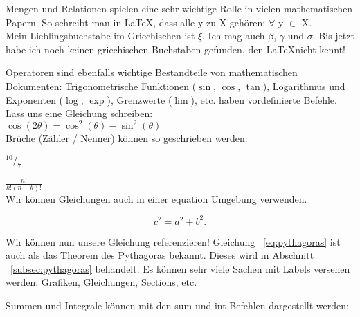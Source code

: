 \documentclass[12pt]{article}
\begin{document}
Mengen und Relationen spielen eine sehr wichtige Rolle in vielen mathematischen
Papern. So schreibt man in \LaTeX, dass alle y zu X gehören: $\forall$ y $\in$ X. \\


Mein Lieblingsbuchstabe im Griechischen ist $\xi$. Ich mag auch $\beta$, $\gamma$ und $\sigma$.
Bis jetzt habe ich noch keinen griechischen Buchstaben gefunden, den \LaTeX nicht kennt!

Operatoren sind ebenfalls wichtige Bestandteile von mathematischen Dokumenten:
Trigonometrische Funktionen ($\sin$, $\cos$, $\tan$),
Logarithmus und Exponenten ($\log$, $\exp$),
Grenzwerte ($\lim$), etc. haben vordefinierte Befehle.
Lass uns eine Gleichung schreiben: \\

$\cos(2\theta) = \cos^{2}(\theta) - \sin^{2}(\theta)$\\

Brüche (Zähler / Nenner) können so geschrieben werden:

$^{10}/_{7}$

$\frac{n!}{k!(n - k)!}$ \\

Wir können Gleichungen auch in einer equation Umgebung verwenden.

\begin{equation} %
    c^2 = a^2 + b^2.
    \label{eq:pythagoras} %
\end{equation} %

Wir können nun unsere Gleichung referenzieren!
Gleichung ~\ref{eq:pythagoras} ist auch als das Theorem des Pythagoras bekannt. Dieses wird in
Abschnitt ~\ref{subsec:pythagoras} behandelt. Es können sehr viele Sachen mit Labels versehen werden:
Grafiken, Gleichungen, Sections, etc.

Summen und Integrale können mit den sum und int Befehlen dargestellt werden:
\end{document}
